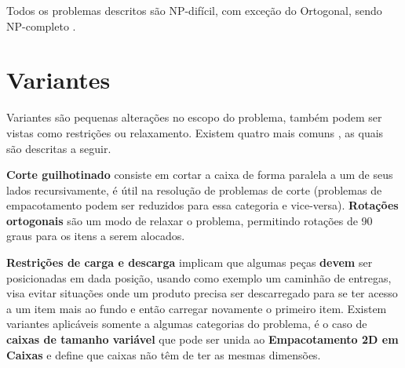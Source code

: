 Todos os problemas descritos são NP-difícil, com exceção do Ortogonal, sendo NP-completo \cite{2DPackLib}.


\section{Variantes}\label{sec:variantes}


Variantes são pequenas alterações no escopo do problema, também podem ser vistas como restrições ou relaxamento.
Existem quatro mais comuns \cite{2DPackLib}, as quais são descritas a seguir.

\textbf{Corte guilhotinado} consiste em cortar a caixa de forma paralela a um de seus lados recursivamente, é útil na resolução de problemas de corte (problemas de empacotamento podem ser reduzidos para essa categoria e vice-versa).
\textbf{Rotações ortogonais} são um modo de relaxar o problema, permitindo rotações de 90 graus para os itens a serem alocados.

\textbf{Restrições de carga e descarga} implicam que algumas peças \textbf{devem} ser posicionadas em dada posição, usando como exemplo um caminhão de entregas, visa evitar situações onde um produto precisa ser descarregado para se ter acesso a um item mais ao fundo e então carregar novamente o primeiro item.
Existem variantes aplicáveis somente a algumas categorias do problema, é o caso de \textbf{caixas de tamanho variável}  que pode ser unida ao \textbf{Empacotamento 2D em Caixas} e define que caixas não têm de ter as mesmas dimensões.
